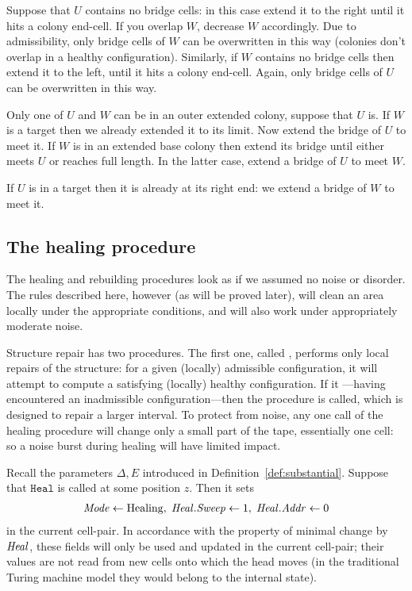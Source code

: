 \documentclass[11pt]{memoir}
\theoremstyle{definition} %
\newcommand{\fld}[1]{\ensuremath{\textit{#1\/}}}
\newcommand{\rul}[1]{\ensuremath{\texttt{#1}}}
\newcommand{\E}{E} %
\newcommand{\z}{z} %
\newcommand{\Addr}{\fld{Addr}}
\newcommand{\Heal}{\fld{Heal}} %
\newcommand{\Mode}{\fld{Mode}}
\newcommand{\Sweep}{\fld{Sweep}} %
\newcommand{\Healing}{\mathrm{Healing}}
\newcommand{\rHeal}{\rul{Heal}}
\begin{document}
\begin{Proof}
\begin{prooof}
Suppose that \( U \) contains no bridge cells: in this case extend it to the right until it hits
a colony end-cell.
If you overlap \( W \), decrease \( W \) accordingly.
Due to admissibility, only bridge cells of \( W \) can be overwritten in this way
(colonies don't overlap in a healthy configuration).
Similarly, if \( W \) contains no bridge cells then extend it to the left, until it hits a colony end-cell.
Again, only bridge cells of \( U \) can be overwritten in this way.

Only one of \( U \) and \( W \) can be in an outer extended colony, suppose that \( U \) is.
If \( W \) is a target then we already extended it to its limit.
Now extend the bridge of \( U \) to meet it.
If \( W \) is in an extended base colony then extend its bridge until either meets \( U \) or
reaches full length.
In the latter case, extend a bridge of \( U \) to meet \( W \).

If \( U \) is in a target then it is already at its right end: we extend a bridge of \( W \) to meet it.
\end{prooof} %
\end{Proof}


\subsection{The healing procedure}\label{sec:healing-proc}

The healing and rebuilding procedures look as if we assumed no noise or disorder.
The rules described here, however (as will be proved later), will clean an area locally under the 
appropriate conditions, and will also work under appropriately moderate noise.

Structure repair has two procedures.
The first one, called , performs
only local repairs of the structure: for a given (locally) admissible configuration,
it will attempt to compute a satisfying (locally) healthy configuration.
If it ---having encountered an inadmissible configuration---then
the  procedure is called, which is designed to repair a larger interval.
To protect from noise, any one call of the healing procedure will change only 
a small part of the tape, essentially one cell: so a noise burst during healing
will have limited impact.

Recall the parameters \( \Delta,\E \) introduced in Definition~\ref{def:substantial}.
Suppose that \( \rHeal \) is called at some position \( \z \).
Then it sets
\begin{align*}
\Mode\gets\Healing,\; \Heal.\Sweep \gets 1,\; \Heal.\Addr \gets 0
\end{align*}
in the current cell-pair.
In accordance with the property of minimal change by \( \Heal \),
these fields will only be used and updated in the current cell-pair; their values are not read from
new cells onto which the head moves (in the traditional Turing machine model they would belong to the
internal state).
\end{document}
